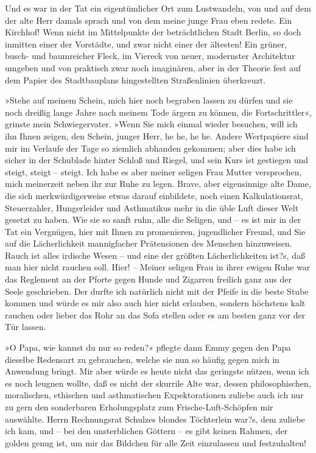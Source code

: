 Und es war in der Tat ein eigentümlicher Ort zum Lustwandeln, von
und auf dem der alte Herr damals sprach und von dem meine junge
Frau eben redete. Ein Kirchhof! Wenn nicht im Mittelpunkte der
beträchtlichen Stadt Berlin, so doch inmitten einer der Vorstädte,
und zwar nicht einer der ältesten! Ein grüner, busch- und
baumreicher Fleck, im Viereck von neuer, modernster Architektur
umgeben und von praktisch zwar noch imaginären, aber in der Theorie
fest auf dem Papier des Stadtbauplans hingestellten Straßenlinien
überkreuzt.

»Stehe auf meinem Schein, mich hier noch begraben lassen zu dürfen
und sie noch dreißig lange Jahre nach meinem Tode ärgern zu können,
die Fortschrittler«, grinste mein Schwiegervater. »Wenn Sie mich
einmal wieder besuchen, will ich ihn Ihnen zeigen, den Schein,
junger Herr, he he, he he. Andere Wertpapiere sind mir im Verlaufe
der Tage so ziemlich abhanden gekommen; aber dies habe ich sicher
in der Schublade hinter Schloß und Riegel, und sein Kurs ist
gestiegen und steigt, steigt – steigt. Ich habe es aber meiner
seligen Frau Mutter versprochen, mich meinerzeit neben ihr zur Ruhe
zu legen. Brave, aber eigensinnige alte Dame, die sich
merkwürdigerweise etwas darauf einbildete, noch einen
Kalkulationsrat, Steuerzahler, Hungerleider und Asthmatikus mehr in
die üble Luft dieser Welt gesetzt zu haben. Wie sie so sanft ruhn,
alle die Seligen, und – es ist mir in der Tat ein Vergnügen, hier
mit Ihnen zu promenieren, jugendlicher Freund, und Sie auf die
Lächerlichkeit mannigfacher Prätensionen des Menschen hinzuweisen.
Rauch ist alles irdische Wesen – und eine der größten
Lächerlichkeiten ist?s, daß man hier nicht rauchen soll. Hier! –
Meiner seligen Frau in ihrer ewigen Ruhe war das Reglement an der
Pforte gegen Hunde und Zigarren freilich ganz aus der Seele
geschrieben. Der durfte ich natürlich nicht mit der Pfeife in die
beste Stube kommen und würde es mir also auch hier nicht erlauben,
sondern höchstens kalt rauchen oder lieber das Rohr an das Sofa
stellen oder es am besten ganz vor der Tür lassen.

»O Papa, wie kannst du nur so reden?« pflegte dann Emmy gegen den
Papa dieselbe Redensart zu gebrauchen, welche sie nun so häufig
gegen mich in Anwendung bringt. Mir aber würde es heute nicht das
geringste nützen, wenn ich es noch leugnen wollte, daß es nicht der
skurrile Alte war, dessen philosophischen, moralischen, ethischen
und asthmatischen Expektorationen zuliebe auch ich nur zu gern den
sonderbaren Erholungsplatz zum Frische-Luft-Schöpfen mir auswählte.
Herrn Rechnungsrat Schulzes blondes Töchterlein war?s, dem zuliebe
ich kam, und – bei den unsterblichen Göttern – es gibt keinen
Rahmen, der golden genug ist, um mir das Bildchen für alle Zeit
einzulassen und festzuhalten!


